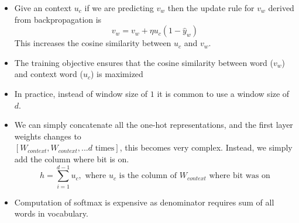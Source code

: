 \documentclass[a4paper]{article}
\begin{document}
\begin{itemize}
    \item Give an context $u_c$ if we are predicting $v_w$ then the update rule for $v_w$ derived from backpropagation is
    \begin{equation*}
        v_w=v_w+\eta u_c(1-\hat{y}_w)
    \end{equation*}
    This increases the cosine similarity between $u_c$ and $v_w$.
    \item The training objective ensures that the cosine similarity between word ($v_w$) and context word ($u_c$) is maximized
    \item In practice, instead of window size of $1$ it is common to use a window size of $d$.
    \item We can simply concatenate all the one-hot representations, and the first layer weights changes to\\
    $[W_{context},W_{context},...d\text{ times}]$, this becomes very complex. Instead, we simply add the column where bit is on.
    \begin{equation*}
        h=\sum_{i=1}^{d-1}u_c,\text{ where }u_c\text{ is the column of }W_{context}\text{ where bit was on}
    \end{equation*}
    \item Computation of softmax is expensive as denominator requires sum of all words in vocabulary.
\end{itemize}
\end{document}

